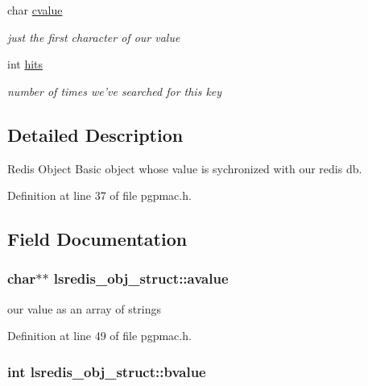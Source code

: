 \begin{DoxyCompactItemize}
$$char \hyperlink{structlsredis__obj__struct_a4a5933dbd44d33d9f594f6020a443b69}{cvalue}
\begin{DoxyCompactList}\small\item\em just the first character of our value \end{DoxyCompactList}\item 
int \hyperlink{structlsredis__obj__struct_a43fcbff584654ab086d973ce34cb6ddc}{hits}
\begin{DoxyCompactList}\small\item\em number of times we've searched for this key \end{DoxyCompactList}\end{DoxyCompactItemize}


\subsection{Detailed Description}
Redis Object Basic object whose value is sychronized with our redis db. 

Definition at line 37 of file pgpmac.\-h.



\subsection{Field Documentation}
\hypertarget{structlsredis__obj__struct_ac065eeede0e08f25bcfedd45022fe593}{
\subsubsection[{avalue}]{\setlength{\rightskip}{0pt plus 5cm}char$\ast$$\ast$ lsredis\-\_\-obj\-\_\-struct\-::avalue}}\label{structlsredis__obj__struct_ac065eeede0e08f25bcfedd45022fe593}


our value as an array of strings 



Definition at line 49 of file pgpmac.\-h.

\hypertarget{structlsredis__obj__struct_ac3df3eaa275c1e8e333024c1fa8353af}{
\subsubsection[{bvalue}]{\setlength{\rightskip}{0pt plus 5cm}int lsredis\-\_\-obj\-\_\-struct\-::bvalue}}\label{structlsredis__obj__struct_ac3df3eaa275c1e8e333024c1fa8353af}


